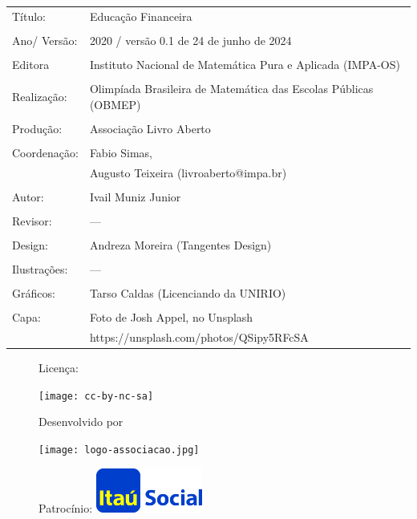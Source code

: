 
\begin{tabular}{p{}p{}}
Título: & Educação Financeira\\
\\
Ano/ Versão: & 2020 / versão 0.1 de 24 de junho de 2024\\
\\
Editora & Instituto Nacional de Matem\'atica Pura e Aplicada (IMPA-OS)\\
\\
Realização:& Olimp\'iada Brasileira de Matem\'atica das Escolas P\'ublicas (OBMEP)\\
\\
Produção:& Associação Livro Aberto\\
\\
Coordenação: & Fabio Simas, \\
			&  Augusto Teixeira (livroaberto@impa.br)\\
\\
  Autor: & Ivail Muniz Junior\\
        
\\
Revisor: &  ---  \\
\\
Design: & Andreza Moreira (Tangentes Design) \\
\\
  Ilustrações: & --- \\ 
\\
Gráficos: & Tarso Caldas (Licenciando da UNIRIO)\\
\\
  Capa: & Foto de Josh Appel, no Unsplash \\
  		& https://unsplash.com/photos/QSipy5RFcSA \\

\end{tabular}
\vspace{.5cm}



\begin{figure}[b]
\begin{minipage}[l]{5cm}
\centering

{\large Licença:}

  \texttt{[image: cc-by-nc-sa]}
\end{minipage}\hfill
\begin{minipage}[c]{5cm}
\centering
{\large Desenvolvido por}

\texttt{[image: logo-associacao.jpg]}
\end{minipage}
\begin{minipage}[r]{5cm}
\centering

{\large Patrocínio:}
  \vspace{1em}
  \includegraphics[width=3.5cm]{itau}
\end{minipage}
\end{figure}

